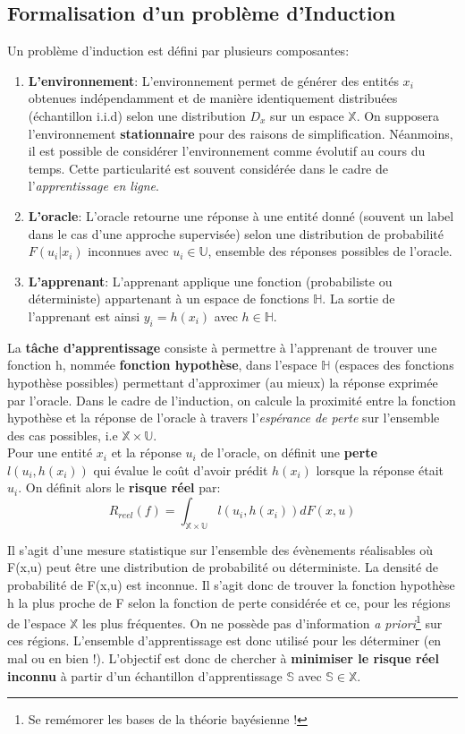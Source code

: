 \subsection{Formalisation d'un problème d'Induction}

\noindent Un problème d'induction est défini par plusieurs composantes:
\begin{enumerate}
    \item \textbf{L'environnement}: L'environnement permet de générer des entités $x_i$ obtenues indépendamment et de manière identiquement distribuées (échantillon i.i.d) selon une distribution $D_x$ sur un espace $\mathbb{X}$. On supposera l'environnement \textbf{stationnaire} pour des raisons de simplification. Néanmoins, il est possible de considérer l'environnement comme évolutif au cours du temps. Cette particularité est souvent considérée dans le cadre de l'\textit{apprentissage en ligne}.
    \item \textbf{L'oracle}: L'oracle retourne une réponse à une entité donné (souvent un label dans le cas d'une approche supervisée) selon une distribution de probabilité $F(u_i|x_i)$ inconnues avec $u_i \in \mathbb{U}$, ensemble des réponses possibles de l'oracle.
    \item \textbf{L'apprenant}: L'apprenant applique une fonction (probabiliste ou déterministe) appartenant à un espace de fonctions $\mathbb{H}$. La sortie de l'apprenant est ainsi $y_i=h(x_i)$ avec $h \in \mathbb{H}$.
\end{enumerate}

\noindent La \textbf{tâche d'apprentissage} consiste à permettre à l'apprenant de trouver une fonction h, nommée \textbf{fonction hypothèse},  dans l'espace $\mathbb{H}$ (espaces des fonctions hypothèse possibles) permettant d'approximer (au mieux) la réponse exprimée par l'oracle. Dans le cadre de l'induction, on calcule la proximité entre la fonction hypothèse et la réponse de l'oracle à travers l'\textit{espérance de perte} sur l'ensemble des cas possibles, i.e $\mathbb{X} \times \mathbb{U}$. \\

\noindent Pour une entité $x_i$ et la réponse $u_i$ de l'oracle, on définit une \textbf{perte} $l(u_i,h(x_i))$ qui évalue le coût d'avoir prédit $h(x_i)$ lorsque la réponse était $u_i$. On définit alors le \textbf{risque réel} par:
$$R_{reel}(f) = \int_{\mathbb{X} \times \mathbb{U}}l(u_i,h(x_i))dF(x,u)$$

\noindent Il s'agit d'une mesure statistique sur l'ensemble des évènements réalisables où F(x,u) peut être une distribution de probabilité ou déterministe. La densité de probabilité de F(x,u) est inconnue. Il s'agit donc de trouver la fonction hypothèse h la plus proche de F selon la fonction de perte considérée et ce, pour les régions de l'espace $\mathbb{X}$ les plus fréquentes. On ne possède pas d'information \textit{a priori}\footnote{Se remémorer les bases de la théorie bayésienne !} sur ces régions. L'ensemble d'apprentissage est donc utilisé pour les déterminer (en mal ou en bien !). L'objectif est donc de chercher à \textbf{minimiser le risque réel inconnu} à partir d'un échantillon d'apprentissage $\mathbb{S}$ avec $\mathbb{S} \in \mathbb{X}$.\\

